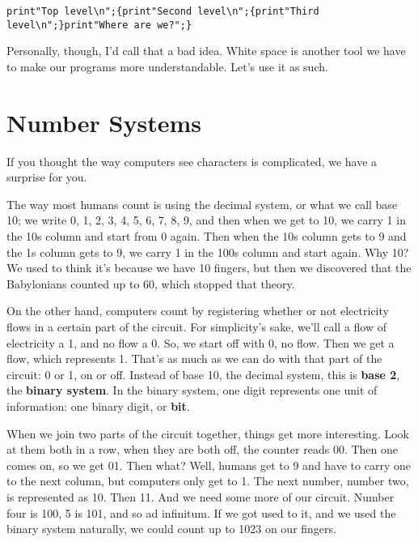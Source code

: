 \documentclass[a4paper,11pt]{book}
\begin{document}
\noindent 

\noindent \texttt{print"Top level\textbackslash n";\{print"Second level\textbackslash n";\{print"Third level\textbackslash n";\}print"Where are we?";\}}

\noindent 

\noindent Personally, though, I'd call that a bad idea. White space is another tool we have to make our programs more understandable. Let's use it as such.

\noindent 

\section{Number Systems}

\noindent 

\noindent If you thought the way computers see characters is complicated, we have a surprise for you.

\noindent 

\noindent The way most humans count is using the decimal system, or what we call base 10; we write 0, 1, 2, 3, 4, 5, 6, 7, 8, 9, and then when we get to 10, we carry 1 in the 10s column and start from 0 again. Then when the 10s column gets to 9 and the 1s column gets to 9, we carry 1 in the 100s column and start again. Why 10? We used to think it's because we have 10 fingers, but then we discovered that the Babylonians counted up to 60, which stopped that theory.

\noindent 

\noindent On the other hand, computers count by registering whether or not electricity flows in a certain part of the circuit. For simplicity's sake, we'll call a flow of electricity a 1, and no flow a 0. So, we start off with 0, no flow. Then we get a flow, which represents 1. That's as much as we can do with that part of the circuit: 0 or 1, on or off. Instead of base 10, the decimal system, this is \textbf{base 2}, the \textbf{binary system}. In the binary system, one digit represents one unit of information: one binary digit, or \textbf{bit}.

\noindent 

\noindent When we join two parts of the circuit together, things get more interesting. Look at them both in a row, when they are both off, the counter reads 00. Then one comes on, so we get 01. Then what? Well, humans get to 9 and have to carry one to the next column, but computers only get to 1. The next number, number two, is represented as 10. Then 11. And we need some more of our circuit. Number four is 100, 5 is 101, and so ad infinitum. If we got used to it, and we used the binary system naturally, we could count up to 1023 on our fingers.
\end{document}
